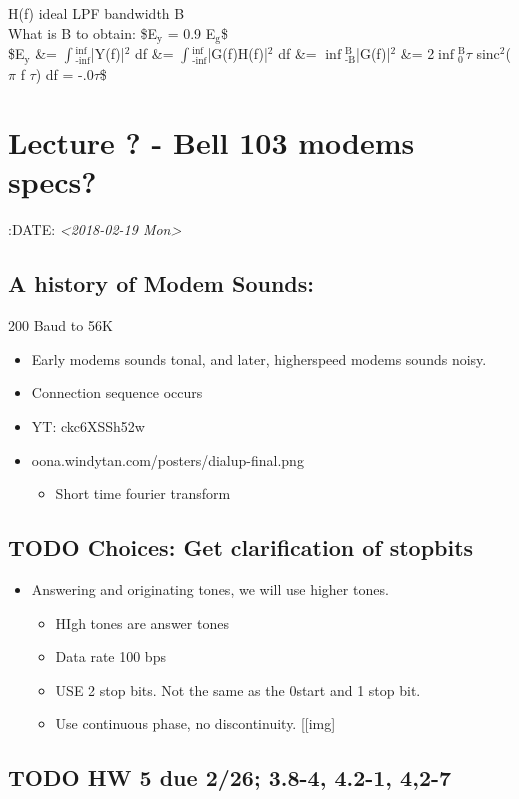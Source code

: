 \documentclass[11pt]{article}
\begin{document}
H(f) ideal LPF bandwidth B\\
    What is B to obtain: \$E$_{\text{y}}$ = 0.9 E$_{\text{g}}$\$\\
    \$E$_{\text{y}}$ \&= $\int$$_{\text{-}\inf}^{\inf}$|Y(f)|$^{\text{2}}$ df \&= $\int$$_{\text{-}\inf}^{\inf}$|G(f)H(f)|$^{\text{2}}$ df \&= $\inf$$_{\text{-B}}^{\text{B}}$|G(f)|$^{\text{2}}$ \&= 2$\inf$$_{\text{0}}^{\text{B}}$$\tau$ sinc$^{\text{2}}$($\pi$ f $\tau$) df = -.0$\tau$\$\\
\section{Lecture ? - Bell 103 modems specs?}
\label{sec-11}
:DATE: \textit{<2018-02-19 Mon>}

\subsection{A history of Modem Sounds:}
\label{sec-11-1}
200 Baud to 56K
\begin{itemize}
\item Early modems sounds tonal, and later, higherspeed modems sounds noisy.
\item Connection sequence occurs
\item YT: ckc6XSSh52w
\item oona.windytan.com/posters/dialup-final.png
\begin{itemize}
\item Short time fourier transform
\end{itemize}
\end{itemize}
\subsection{{\bfseries\sffamily TODO} Choices: Get clarification of stopbits}
\label{sec-11-2}
\begin{itemize}
\item Answering and originating tones, we will use higher tones.
\begin{itemize}
\item HIgh tones are answer tones
\item Data rate 100 bps
\item USE 2 stop bits. Not the same as the 0start and 1 stop bit.
\item Use continuous phase, no discontinuity.
[[img]
\end{itemize}
\end{itemize}
\subsection{{\bfseries\sffamily TODO} HW 5 due 2/26; 3.8-4, 4.2-1, 4,2-7}
\label{sec-11-3}
\end{document}
